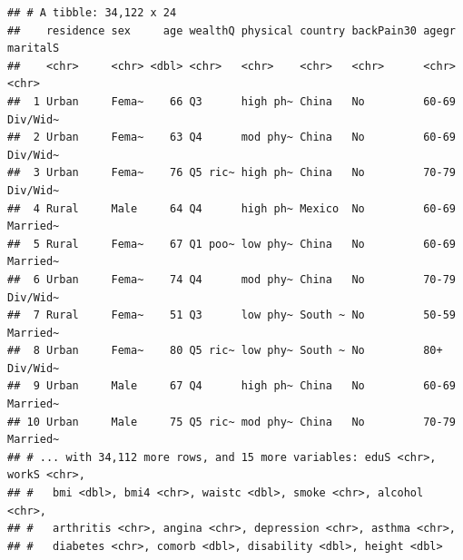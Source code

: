 \documentclass[titlepage]{book}
\makeatletter
\newenvironment{kframe}{%
 \def\at@end@of@kframe{}%
 \ifinner\ifhmode%
  \def\at@end@of@kframe{\end{minipage}}%
  \begin{minipage}{\columnwidth}%
 \fi\fi%
 \def\FrameCommand##1{\hskip\@totalleftmargin \hskip-\fboxsep
 \colorbox{shadecolor}{##1}\hskip-\fboxsep
     \hskip-\linewidth \hskip-\@totalleftmargin \hskip\columnwidth}%
 \MakeFramed {\advance\hsize-\width
   \@totalleftmargin\z@ \linewidth\hsize
   \@setminipage}}%
 {\par\unskip\endMakeFramed%
 \at@end@of@kframe}
\newenvironment{knitrout}{}{} %
\makeatother
\begin{document}
\begin{knitrout}
\begin{kframe}
\begin{verbatim}
## # A tibble: 34,122 x 24
##    residence sex     age wealthQ physical country backPain30 agegr maritalS
##    <chr>     <chr> <dbl> <chr>   <chr>    <chr>   <chr>      <chr> <chr>   
##  1 Urban     Fema~    66 Q3      high ph~ China   No         60-69 Div/Wid~
##  2 Urban     Fema~    63 Q4      mod phy~ China   No         60-69 Div/Wid~
##  3 Urban     Fema~    76 Q5 ric~ high ph~ China   No         70-79 Div/Wid~
##  4 Rural     Male     64 Q4      high ph~ Mexico  No         60-69 Married~
##  5 Rural     Fema~    67 Q1 poo~ low phy~ China   No         60-69 Married~
##  6 Urban     Fema~    74 Q4      mod phy~ China   No         70-79 Div/Wid~
##  7 Rural     Fema~    51 Q3      low phy~ South ~ No         50-59 Married~
##  8 Urban     Fema~    80 Q5 ric~ low phy~ South ~ No         80+   Div/Wid~
##  9 Urban     Male     67 Q4      high ph~ China   No         60-69 Married~
## 10 Urban     Male     75 Q5 ric~ mod phy~ China   No         70-79 Married~
## # ... with 34,112 more rows, and 15 more variables: eduS <chr>, workS <chr>,
## #   bmi <dbl>, bmi4 <chr>, waistc <dbl>, smoke <chr>, alcohol <chr>,
## #   arthritis <chr>, angina <chr>, depression <chr>, asthma <chr>,
## #   diabetes <chr>, comorb <dbl>, disability <dbl>, height <dbl>
\end{verbatim}
\end{kframe}
\end{knitrout}
\end{document}

